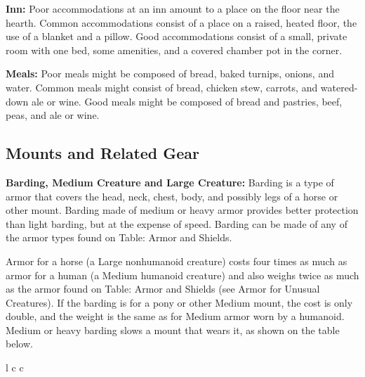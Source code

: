 \begin{multicols}{2}
\textbf{Inn:} Poor accommodations at an inn amount to a place on the floor near 
the hearth. Common accommodations consist of a place on a raised, heated floor, 
the use of a blanket and a pillow. Good accommodations consist of a small, private 
room with one bed, some amenities, and a covered chamber pot in the corner.

\textbf{Meals:} Poor meals might be composed of bread, baked turnips, onions, and 
water. Common meals might consist of bread, chicken stew, carrots, and watered-down 
ale or wine. Good meals might be composed of bread and pastries, beef, peas, and 
ale or wine.

\subsection{Mounts and Related Gear}

\textbf{Barding, Medium Creature and Large Creature:} Barding is a type of armor 
that covers the head, neck, chest, body, and possibly legs of a horse or other 
mount. Barding made of medium or heavy armor provides better protection than light 
barding, but at the expense of speed. Barding can be made of any of the armor types 
found on Table: Armor and Shields.

Armor for a horse (a Large nonhumanoid creature) costs four times as much as armor 
for a human (a Medium humanoid creature) and also weighs twice as much as the armor 
found on Table: Armor and Shields (see Armor for Unusual Creatures). If the barding 
is for a pony or other Medium mount, the cost is only double, and the weight is 
the same as for Medium armor worn by a humanoid. Medium or heavy barding slows 
a mount that wears it, as shown on the table below.

\begin{multicolsbasictable}{l c c}


\end{multicolsbasictable}
\end{multicols}
